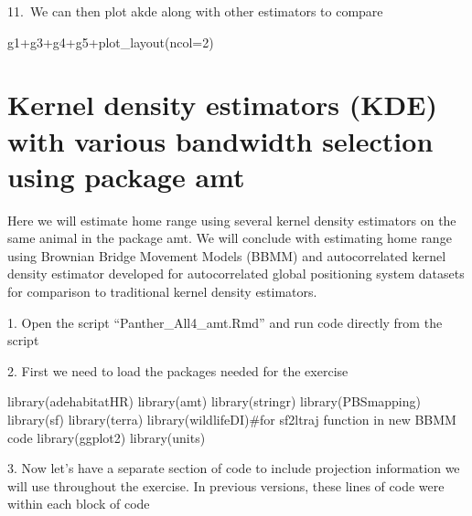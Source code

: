\documentclass[
  letterpaper,
]{book}
\newenvironment{Shaded}{\begin{snugshade}}{\end{snugshade}}
\newcommand{\AttributeTok}[1]{\textcolor[rgb]{0.40,0.45,0.13}{#1}}
\newcommand{\CommentTok}[1]{\textcolor[rgb]{0.37,0.37,0.37}{#1}}
\newcommand{\DecValTok}[1]{\textcolor[rgb]{0.68,0.00,0.00}{#1}}
\newcommand{\FunctionTok}[1]{\textcolor[rgb]{0.28,0.35,0.67}{#1}}
\newcommand{\NormalTok}[1]{\textcolor[rgb]{0.00,0.23,0.31}{#1}}
\newcommand{\SpecialCharTok}[1]{\textcolor[rgb]{0.37,0.37,0.37}{#1}}
\begin{document}
11.~We can then plot akde along with other estimators to compare

\begin{Shaded}
\begin{Highlighting}[]
\NormalTok{g1}\SpecialCharTok{+}\NormalTok{g3}\SpecialCharTok{+}\NormalTok{g4}\SpecialCharTok{+}\NormalTok{g5}\SpecialCharTok{+}\FunctionTok{plot\_layout}\NormalTok{(}\AttributeTok{ncol=}\DecValTok{2}\NormalTok{)}
\end{Highlighting}
\end{Shaded}

\hypertarget{kernel-density-estimators-kde-with-various-bandwidth-selection-using-package-amt}{%
\chapter{Kernel density estimators (KDE) with various bandwidth
selection using package
amt}\label{kernel-density-estimators-kde-with-various-bandwidth-selection-using-package-amt}}

Here we will estimate home range using several kernel density estimators
on the same animal in the package amt. We will conclude with estimating
home range using Brownian Bridge Movement Models (BBMM) and
autocorrelated kernel density estimator developed for autocorrelated
global positioning system datasets for comparison to traditional kernel
density estimators.

1. Open the script ``Panther\_All4\_amt.Rmd'' and run code directly from
the script

2. First we need to load the packages needed for the exercise

\begin{Shaded}
\begin{Highlighting}[]
\FunctionTok{library}\NormalTok{(adehabitatHR)}
\FunctionTok{library}\NormalTok{(amt)}
\FunctionTok{library}\NormalTok{(stringr)}
\FunctionTok{library}\NormalTok{(PBSmapping)}
\FunctionTok{library}\NormalTok{(sf)}
\FunctionTok{library}\NormalTok{(terra)}
\FunctionTok{library}\NormalTok{(wildlifeDI)}\CommentTok{\#for sf2ltraj function in new BBMM code}
\FunctionTok{library}\NormalTok{(ggplot2)}
\FunctionTok{library}\NormalTok{(units)}
\end{Highlighting}
\end{Shaded}

3. Now let's have a separate section of code to include projection
information we will use throughout the exercise. In previous versions,
these lines of code were within each block of code
\end{document}

